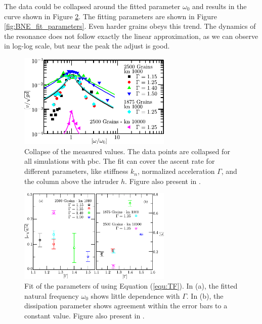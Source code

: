     The data could be collapsed around the fitted parameter $\omega_0$ and results in the curve shown in Figure \ref{fig:BNE_collapse}. The fitting parameters are shown in Figure \ref{fig:BNE_fit_parameters}. Even harder grains obeys this trend. The dynamics of the resonance does not follow exactly the linear approximation, as we can observe in log-log scale, but near the peak the adjust is good.

\begin{figure}
    \centering
    \includegraphics[width=0.65\textwidth]{04-figuras/BNE_Collapse.pdf}
    \caption[BNE with periodic boundary: resonance collapse.]{Collapse of the measured values. The data points are collapsed for all simulations with pbc. The fit can cover the ascent rate for different parameters, like stiffness $k_n$, normalized acceleration $\Gamma$, and the column above the intruder $h$. Figure also present in \cite{Large-deviation_quantification_of_boundary_conditions_on_the_Brazil_nut_effect}.}
    \label{fig:BNE_collapse}
\end{figure}

\begin{figure}
    \centering
    \includegraphics[width=0.65\textwidth]{04-figuras/BNE_Fit.pdf}
    \caption[BNE with periodic boundary: resonance fitting parameters.]{Fit of the parameters of using Equation (\ref{equ:TF}). In (a), the fitted natural frequency $\omega_0$ shows little dependence with $\Gamma$. In (b), the dissipation parameter shows agreement within the error bars to a constant value. Figure also present in \cite{Large-deviation_quantification_of_boundary_conditions_on_the_Brazil_nut_effect}.}
    \label{fig:BNE_collapse}
\end{figure}

